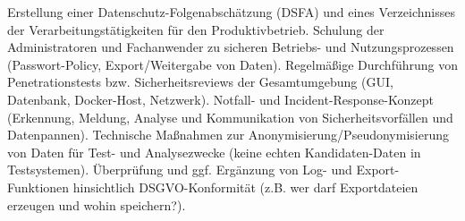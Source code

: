 Erstellung einer Datenschutz-Folgenabschätzung (DSFA) und eines Verzeichnisses der Verarbeitungstätigkeiten für den Produktivbetrieb.
Schulung der Administratoren und Fachanwender zu sicheren Betriebs- und Nutzungsprozessen (Passwort-Policy, Export/Weitergabe von Daten).
Regelmäßige Durchführung von Penetrationstests bzw. Sicherheitsreviews der Gesamtumgebung (GUI, Datenbank, Docker-Host, Netzwerk).
Notfall- und Incident-Response-Konzept (Erkennung, Meldung, Analyse und Kommunikation von Sicherheitsvorfällen und Datenpannen).
Technische Maßnahmen zur Anonymisierung/Pseudonymisierung von Daten für Test- und Analysezwecke (keine echten Kandidaten-Daten in Testsystemen).
Überprüfung und ggf. Ergänzung von Log- und Export-Funktionen hinsichtlich DSGVO-Konformität (z.B. wer darf Exportdateien erzeugen und wohin speichern?).
